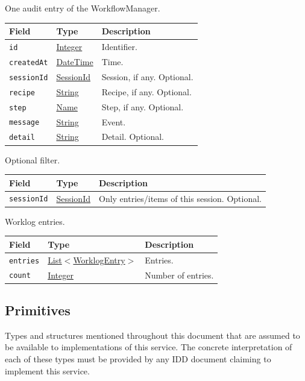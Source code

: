 \documentclass[a4paper]{arrowhead}
\newcommand{\mref}[1]{{\textcolor{ArrowheadPurple}{\hyperref[sec:model:#1]{#1}}}}
\newcommand{\pref}[1]{{\textcolor{ArrowheadGrey}{\hyperref[sec:model:primitives:#1]{#1}}}}
\begin{document}
One audit entry of the WorkflowManager.

{\small
\begin{longtable}{|p{3.9cm}|p{4.4cm}|p{7.5cm}|}

\hline
\rowcolor{gray!33} Field & Type & Description \\ \hline
\endhead
\texttt{id} & \pref{Integer} & Identifier. \\ \hline
\texttt{createdAt} & \pref{DateTime} & Time. \\ \hline
\texttt{sessionId} & \pref{SessionId} & Session, if any. Optional. \\ \hline
\texttt{recipe} & \pref{String} & Recipe, if any. Optional. \\ \hline
\texttt{step} & \pref{Name} & Step, if any. Optional. \\ \hline
\texttt{message} & \pref{String} & Event. \\ \hline
\texttt{detail} & \pref{String} & Detail. Optional. \\ \hline
\end{longtable}
}

Optional filter.

{\small
\begin{longtable}{|p{3.9cm}|p{4.4cm}|p{7.5cm}|}

\hline
\rowcolor{gray!33} Field & Type & Description \\ \hline
\endhead
\texttt{sessionId} & \pref{SessionId} & Only entries/items of this session. Optional. \\ \hline
\end{longtable}
}

Worklog entries.

{\small
\begin{longtable}{|p{3.9cm}|p{4.4cm}|p{7.5cm}|}

\hline
\rowcolor{gray!33} Field & Type & Description \\ \hline
\endhead
\texttt{entries} & \pref{List}$<$\mref{WorklogEntry}$>$ & Entries. \\ \hline
\texttt{count} & \pref{Integer} & Number of entries. \\ \hline
\end{longtable}
}


\subsection{Primitives}
\label{sec:model:primitives}
Types and structures mentioned throughout this document that are assumed to be available to implementations of this
service. The concrete interpretation of each of these types must be provided by any IDD document claiming to implement
this service.
\end{document}
